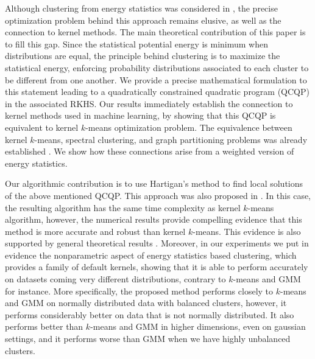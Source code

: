\documentclass[aps,preprint,nofootinbib,floatfix]{revtex4-1}
\begin{document}
Although clustering from energy statistics was considered
in \cite{Kgroups}, the precise optimization problem behind this approach
remains elusive, as well as the connection to kernel methods.
The main theoretical contribution of this paper is to fill this gap.
Since the statistical potential energy is minimum when
distributions are equal, the
principle behind clustering is to maximize the statistical energy, 
enforcing probability distributions associated to each cluster
to be different from one another.
We provide a precise mathematical formulation to this
statement 
leading to
a quadratically constrained
quadratic program (QCQP) in the associated RKHS. Our results immediately 
establish the connection 
to kernel methods used in machine learning, 
by showing that this QCQP is equivalent
to kernel $k$-means optimization problem. 
The equivalence between kernel $k$-means, 
spectral clustering, and graph partitioning problems was already established
\cite{Dhillon,Dhillon2}. We show how these connections arise
from a weighted version of energy statistics.

Our algorithmic contribution is to use Hartigan's method
\cite{Hartigan} to find local 
solutions of the above mentioned QCQP.
This approach was also proposed in \cite{Kgroups}.
In this case,
the resulting algorithm has the same
time complexity as kernel $k$-means algorithm, however, the numerical 
results provide compelling evidence that this method
is more accurate and robust than kernel $k$-means. This evidence
is also supported by general theoretical results \cite{Telgarsky,Slonin}.
Moreover, in our experiments we put in
evidence the nonparametric aspect of energy
statistics based clustering, which provides a family of 
default kernels, showing that
it is able to perform accurately on datasets coming very different 
distributions, contrary to $k$-means and GMM for instance.
More specifically, the proposed method performs closely to $k$-means
and GMM on normally distributed data with balanced clusters, however, it
performs considerably better on  data that is not normally distributed.
It also
performs better than $k$-means and GMM in higher dimensions, even on
gaussian settings, and it performs worse than
GMM when we have highly unbalanced clusters.
\end{document}

